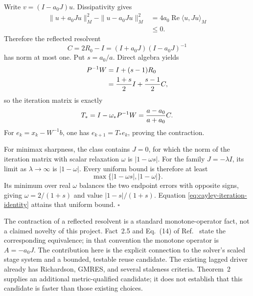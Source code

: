 Write $v=(I-a_0J)u$.  Dissipativity gives
\begin{align}
 \|u+a_0Ju\|_M^2-\|u-a_0Ju\|_M^2
 &=4a_0\operatorname{Re}\langle u,Ju\rangle_M\nonumber\\
 &\leq0.
\end{align}
Therefore the reflected resolvent
\begin{equation}
 C=2R_0-I=(I+a_0J)(I-a_0J)^{-1}
\end{equation}
has norm at most one.  Put $s=a_0/a$.  Direct algebra yields
\begin{align}
 P^{-1}W
 &=I+(s-1)R_0\nonumber\\
 &={1+s\over2}I+{s-1\over2}C,
\end{align}
so the iteration matrix is exactly
\begin{equation}
 T_*=I-\omega_*P^{-1}W
 ={a-a_0\over a+a_0}C.
 \label{eq:cayley-iteration-identity}
\end{equation}
For $e_k=x_k-W^{-1}b$, one has $e_{k+1}=T_*e_k$, proving the contraction.

For minimax sharpness, the class contains $J=0$, for which the norm of the
iteration matrix with scalar relaxation $\omega$ is $|1-\omega s|$.  For the
family $J=-\lambda I$, its limit as $\lambda\to\infty$ is $|1-\omega|$.
Every uniform bound is therefore at least
\begin{equation}
 \max\{|1-\omega s|,|1-\omega|\}.
\end{equation}
Its minimum over real $\omega$ balances the two endpoint errors with opposite
signs, giving $\omega=2/(1+s)$ and value $|1-s|/(1+s)$.  Equation
\eqref{eq:cayley-iteration-identity} attains that uniform bound.
\hfill$\square$

The contraction of a reflected resolvent is a standard monotone-operator
fact, not a claimed novelty of this project.  Fact~2.5 and Eq.~(14) of
Ref.~\cite{LiuMoursiVanderwerff2022} state the corresponding equivalence; in
that convention the monotone operator is $A=-a_0J$.  The contribution here is
the explicit connection to the solver's scaled stage system and a bounded,
testable reuse candidate.  The existing lagged driver already has
Richardson, GMRES, and several staleness criteria.  Theorem~2 supplies an
additional metric-qualified candidate; it does not establish that this
candidate is faster than those existing choices.

